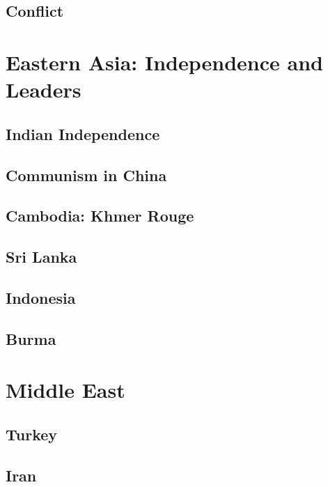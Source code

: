 \subsection*{Conflict}

\section{Eastern Asia: Independence and Leaders}

\subsection*{Indian Independence}

\subsection*{Communism in China}

\subsection*{Cambodia: Khmer Rouge}

\subsection*{Sri Lanka}

\subsection*{Indonesia}

\subsection*{Burma}

\section{Middle East}

\subsection*{Turkey}

\subsection*{Iran}

